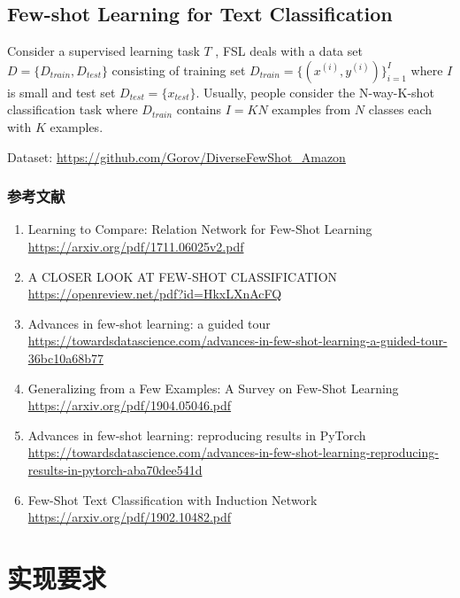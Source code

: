 \documentclass{article}
\begin{document}
\subsection{Few-shot Learning for Text Classification}
Consider a supervised learning task $T$ , FSL deals with a data set $D = \{D_{train},D_{test}\}$ consisting of training set $D_{train} = \{(x^{(i)},y^{(i)})\}^I_{i=1}$ where $I$ is small and test set $D_{test} = \{x_{test}\}$. Usually, people consider the N-way-K-shot classification task  where $D_{train}$ contains $I = KN$ examples
from $N$ classes each with $K$ examples. 

Dataset: \url{https://github.com/Gorov/DiverseFewShot_Amazon}


\subsubsection{参考文献}
\begin{enumerate}
    \item Learning to Compare: Relation Network for Few-Shot Learning\\
    \url{https://arxiv.org/pdf/1711.06025v2.pdf}
    \item A CLOSER LOOK AT FEW-SHOT CLASSIFICATION\\ \url{https://openreview.net/pdf?id=HkxLXnAcFQ}
    \item Advances in few-shot learning: a guided tour\\ \url{https://towardsdatascience.com/advances-in-few-shot-learning-a-guided-tour-36bc10a68b77}
    \item Generalizing from a Few Examples: A Survey on Few-Shot Learning\\
    \url{https://arxiv.org/pdf/1904.05046.pdf}
    \item Advances in few-shot learning: reproducing results in PyTorch\\ \url{https://towardsdatascience.com/advances-in-few-shot-learning-reproducing-results-in-pytorch-aba70dee541d}
    \item  Few-Shot Text Classification with Induction Network\\ \url{https://arxiv.org/pdf/1902.10482.pdf}
\end{enumerate}

\section{实现要求}
\end{document}
